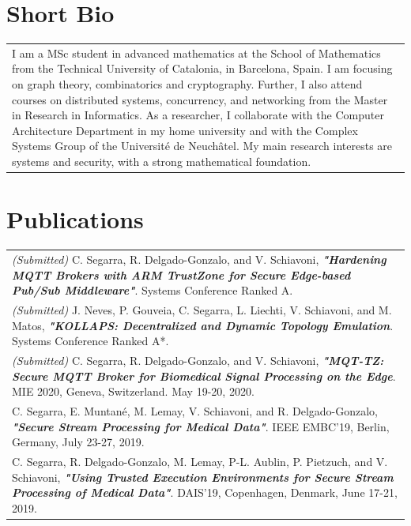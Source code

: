 \documentclass[a4paper,10pt]{article} %
\begin{document}
\section{Short Bio}
\begin{tabular}{p{}}
    I am a MSc student in advanced mathematics at the School of Mathematics from the Technical University of Catalonia, in Barcelona, Spain.
    I am focusing on graph theory, combinatorics and cryptography.
    Further, I also attend courses on distributed systems, concurrency, and networking from the Master in Research in Informatics.
    As a researcher, I collaborate with the Computer Architecture Department in my home university and with the Complex Systems Group of the Universit\'e de Neuch\^atel. 
    My main research interests are systems and security, with a strong mathematical foundation.
\end{tabular}

\section{Publications}
\begin{tabular}{p{}}
    \textit{(Submitted)} C. Segarra, R. Delgado-Gonzalo, and V. Schiavoni, \textbf{\textit{"Hardening MQTT Brokers with ARM TrustZone for Secure Edge-based Pub/Sub Middleware"}}. Systems Conference Ranked A. \\[3pt]
    \textit{(Submitted)} J. Neves, P. Gouveia, C. Segarra, L. Liechti, V. Schiavoni, and M. Matos, \textbf{\textit{"KOLLAPS: Decentralized and Dynamic Topology Emulation}}. Systems Conference Ranked A*. \\[3pt]
    \textit{(Submitted)} C. Segarra, R. Delgado-Gonzalo, and V. Schiavoni, \textbf{\textit{"MQT-TZ: Secure MQTT Broker for Biomedical Signal Processing on the Edge}}. MIE 2020, Geneva, Switzerland. May 19-20, 2020. \\[3pt]
    C. Segarra, E. Muntan\'e, M. Lemay, V. Schiavoni, and  R. Delgado-Gonzalo, \textbf{\textit{"Secure Stream Processing for Medical Data"}}. IEEE EMBC'19, Berlin, Germany, July 23-27, 2019. \\[3pt]
    C. Segarra, R. Delgado-Gonzalo, M. Lemay, P-L. Aublin, P. Pietzuch, and V. Schiavoni, \textbf{\textit{"Using Trusted Execution Environments for Secure Stream Processing of Medical Data"}}. DAIS'19, Copenhagen, Denmark, June 17-21, 2019. \\
\end{tabular}
\end{document}
